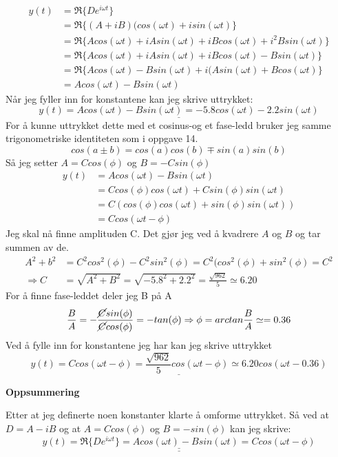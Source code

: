 \documentclass[a4paper,12pt,norsk]{article}
\newcommand{\uu}{\underline}
\begin{document}
\begin{align*}
y(t) &= \Re \big\{De^{i\omega t} \big\}\\
&= \Re \big\{(A+iB)(cos(\omega t) + isin(\omega t) \big\}\\
&= \Re \big\{Acos(\omega t) +iAsin(\omega t) + iBcos(\omega t) +i^2Bsin(\omega t)\big\}\\
&= \Re \big\{Acos(\omega t) +iAsin(\omega t) + iBcos(\omega t) - Bsin(\omega t)\big\} \\
&= \Re \big\{ Acos(\omega t) - Bsin(\omega t) + i(Asin(\omega t)+Bcos(\omega t)\big\}\\
&= Acos(\omega t) - Bsin(\omega t) 
\end{align*}
Når jeg fyller inn for konstantene kan jeg skrive uttrykket:
$$
\uu{y(t) = Acos(\omega t) - Bsin(\omega t) = -5.8cos(\omega t) - 2.2sin(\omega t)}
$$
For å kunne uttrykket dette med et cosinus-og et fase-ledd bruker jeg samme trigonometriske identiteten som i oppgave 14. 
$$
cos(a\pm b) = cos(a)cos(b) \mp sin(a)sin(b)
$$ 
Så jeg setter $A = Ccos(\phi)$ og $B = -Csin(\phi)$
\begin{align*}
y(t) &= Acos(\omega t) - Bsin(\omega t)\\
&=Ccos(\phi)cos(\omega t) +Csin(\phi)sin(\omega t)\\
&= C(cos(\phi)cos(\omega t) +sin(\phi)sin(\omega t))\\
&= Ccos(\omega t - \phi)
\end{align*}
Jeg skal nå finne amplituden C. Det gjør jeg ved å kvadrere $A$ og $B$ og tar summen av de.
\begin{align*}
A^2+b^2 &= C^2cos^2(\phi) -C^2sin^2(\phi) = C^2(cos^2(\phi) + sin^2(\phi) = C^2\\
\Rightarrow C &= \sqrt{A^2+B^2} = \sqrt{-5.8^2+2.2^2} = \frac{\sqrt{962}}{5} \simeq 6.20
\end{align*}
For å finne fase-leddet deler jeg B på A
$$
\frac{B}{A}=-\frac{\cancel{C}sin(\phi)}{\cancel{C}cos(\phi)} = -tan(\phi)
\Rightarrow \phi = arctan\frac{B}{A} \simeq = 0.36
$$
Ved å fylle inn for konstantene jeg har kan jeg skrive uttrykket
$$
\uu{y(t) = Ccos(\omega t - \phi) = \frac{\sqrt{962}}{5}cos(\omega t - \phi) \simeq 6.20cos(\omega t - 0.36) }
$$
\begin{center}
\textbf{Oppsummering}
\end{center}
Etter at jeg definerte noen konstanter klarte å omforme uttrykket. Så ved at $D = A-iB$ og at $A = Ccos(\phi)$ og $B = -sin(\phi)$ kan jeg skrive:
$$
\uu{\uu{y(t) = \Re\big\{ De^{i\omega t}\big\} = Acos(\omega t) - Bsin(\omega t) = Ccos(\omega t - \phi)}}
$$
\end{document}
